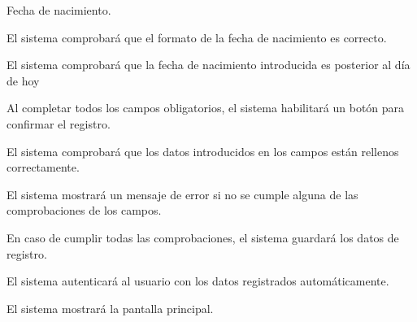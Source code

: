 \begin{enumitem}[label=\bfseries{RReg \arabic*.},leftmargin=*]
\begin{enumitem}[label*=\bfseries{\arabic*.}]
\begin{enumitem}[label*=\bfseries{\arabic*.}]
\begin{enumitem}[label*=\bfseries{\arabic*.}]
			\end{enumitem}
			\item Fecha de nacimiento.
			\begin{enumitem}[label*=\bfseries{\arabic*.}]
				\item El sistema comprobará que el formato de la fecha de nacimiento es correcto.
				\item El sistema comprobará que la fecha de nacimiento introducida es posterior al día de hoy
			\end{enumitem}
		\end{enumitem}
		\item Al completar todos los campos obligatorios, el sistema habilitará un botón para confirmar el registro.
		\begin{enumitem}[label*=\bfseries{\arabic*.}]
			\item El sistema comprobará que los datos introducidos en los campos están rellenos correctamente.
			\begin{enumitem}[label*=\bfseries{\arabic*.}]
				\item El sistema mostrará un mensaje de error si no se cumple alguna de las comprobaciones de los campos.
				\item En caso de cumplir todas las comprobaciones, el sistema guardará los datos de registro.
				\begin{enumitem}[label*=\bfseries{\arabic*.}]
					\item El sistema autenticará al usuario con los datos registrados automáticamente.
					\item El sistema mostrará la pantalla principal.
				\end{enumitem}
			\end{enumitem}
		\end{enumitem}
	\end{enumitem}
\end{enumitem}
